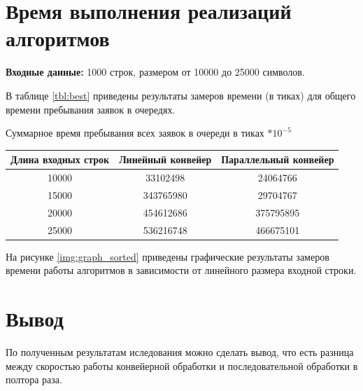 \section{Время выполнения реализаций алгоритмов}

\textbf{Входные данные:} 1000 строк, размером от 10000 до 25000 символов.

В таблице \ref{tbl:best} приведены результаты замеров времени (в тиках) для общего времени пребывания заявок в очередях.

\begin{center}
	\begin{threeparttable}
		\caption{Суммарное время пребывания всех заявок в очереди в тиках $* 10^{-5}$}
		\label{tbl:best}
		\begin{tabular}{|c|c|c|}
			\hline
			Длина входных строк &Линейный конвейер &Параллельный конвейер\\
			\hline
			10000 & 33102498& 24064766 \\
			\hline
		    15000& 343765980 & 29704767 \\
		    \hline
		    20000& 454612686 & 375795895\\
			\hline
		    25000 & 536216748& 466675101 \\
			\hline
		\end{tabular}
		
	\end{threeparttable}
\end{center}


 На рисунке \ref{img:graph_sorted} приведены графические результаты замеров времени работы алгоритмов в зависимости от линейного размера входной строки.

\begin{center}
	\label{img:graph_sorted}
\end{center}





\section{Вывод}
По полученным результатам иследования можно сделать вывод, что есть разница между скоростью работы конвейерной обработки и последовательной обработки в полтора раза.
